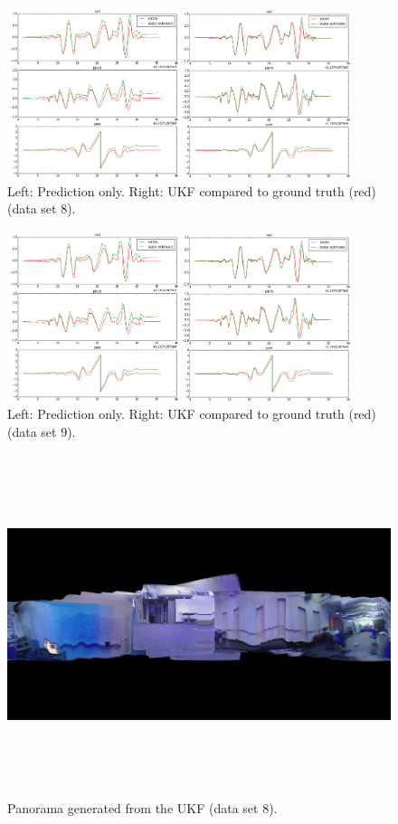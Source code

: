 \documentclass[letterpaper, 10 pt, conference]{ieeeconf}  %
\begin{document}
\begin{figure}
  \includegraphics[width=\textwidth,height=5cm]{compare3}
  \caption{Left: Prediction only. Right: UKF compared to ground truth (red) (data set 8).}
  \label{compare8}
\end{figure}

\begin{figure}
  \includegraphics[width=\textwidth,height=5cm]{compare3}
  \caption{Left: Prediction only. Right: UKF compared to ground truth (red) (data set 9).}
  \label{compare9}
\end{figure}

\begin{figure}
  \includegraphics[width=\textwidth,height=10cm]{panorama8}
  \caption{Panorama generated from the UKF (data set 8).}
  \label{panorama8}
\end{figure}
\end{document}
